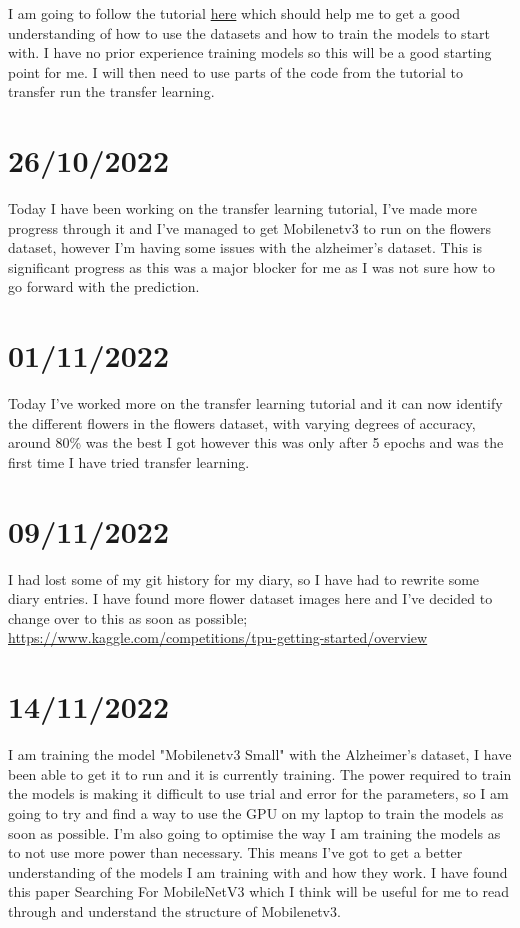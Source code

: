 \documentclass[]{final_report}
\begin{document}
I am going to follow the tutorial \href{https://www.tensorflow.org/tutorials/images/classification}{here}
which should help me to get a good understanding of how to use the datasets and how to train the models to start with.
I have no prior experience training models so this will be a good starting point for me.
I will then need to use parts of the code from the tutorial to transfer run the transfer learning.

\section*{26/10/2022}


Today I have been working on the transfer learning tutorial, I've made more progress through it and I've managed to get
Mobilenetv3 to run on the flowers dataset, however I'm having some issues with the alzheimer's dataset.
This is significant progress as this was a major blocker for me as I was not sure how to go forward with the prediction.

\section*{01/11/2022}

Today I've worked more on the transfer learning tutorial and it can now identify the different flowers in the flowers dataset, 
with varying degrees of accuracy, around 80\% was the best I got however this was only after 5 epochs and was the first time I have tried transfer learning.


\section*{09/11/2022}


I had lost some of my git history for my diary, so I have had to rewrite some diary entries.
I have found more flower dataset images here and I've decided to change over to this as soon as possible;
\href{https://www.kaggle.com/competitions/tpu-getting-started/overview}{https://www.kaggle.com/competitions/tpu-getting-started/overview}

\section*{14/11/2022}

I am training the model "Mobilenetv3 Small" with the Alzheimer's dataset, I have been able to get it to run and it is currently training.
The power required to train the models is making it difficult to use trial and error for the parameters, so I am going to try and find a way to use the GPU on my laptop to train the models as soon as possible.
I'm also going to optimise the way I am training the models as to not use more power than necessary. This means I've got to get a better understanding of the models I am training with and how they work.
I have found this paper Searching For MobileNetV3\cite{DBLP:journals/corr/abs-1905-02244} which I think will be useful for me to read through and understand the structure of Mobilenetv3.
\end{document}
